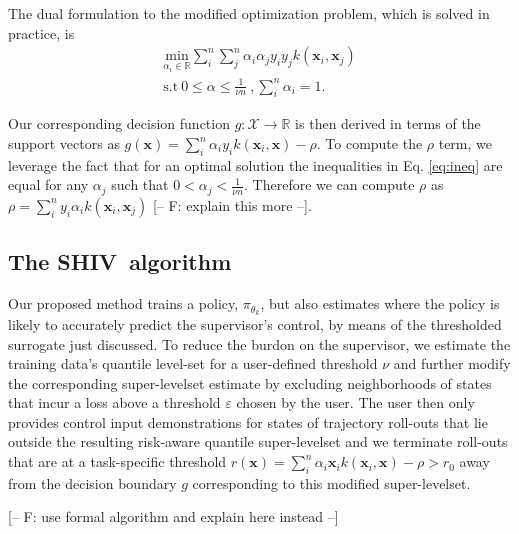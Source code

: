 \documentclass[10pt, conference]{ieeeconf}      %
\newcommand{\bx}{\mathbf{x}}
\newcommand{\acro}{SHIV}
\begin{document}
The dual formulation to the modified optimization problem, which is solved in practice, is 
\begin{align}\label{eq:dual_sup}
\underset{\alpha_i\in \mathbb{R}}{\mbox{min}} \sum_i^n \sum_j^n \alpha_i\alpha_j y_i y_jk(\bx_i,\bx_j)\\
\mbox{s.t} \: 0 \leq \alpha \leq \frac{1}{\nu n} \:, \sum_i^n \alpha_i = 1.
\end{align}

Our corresponding decision function $g:\mathcal{X}\to \mathbb{R}$ is then derived in terms of the support vectors as $g(\bx) = \sum_i^n
\alpha_i y_i k(\bx_i,\bx) - \rho$. To compute the $\rho$ term, we leverage the fact that for an optimal solution the
inequalities in Eq. \ref{eq:ineq} are equal for any $\alpha_j$ such that $0 < \alpha_j < \frac{1}{\nu n}$. Therefore we
can compute $\rho$ as  $\rho = \sum_i^n y_i \alpha_i k(\bx_i,\bx_j)$ \cite{scholkopf2001estimating} {\color{blue} [-- F:
explain this more --]}.



\subsection{The \acro~algorithm}

Our proposed method trains a policy, $\pi_{\theta_k}$, but also estimates where the policy is likely to accurately
predict the supervisor's control, by means of the thresholded surrogate just discussed.  
To reduce the burdon on the supervisor, we estimate the training data's quantile level-set for a user-defined threshold
$\nu$ and further modify the corresponding super-levelset estimate by excluding neighborhoods of states that incur a loss
above a threshold $\varepsilon$ chosen by the user.
The user then only provides control input demonstrations for states of trajectory roll-outs that lie outside the
resulting risk-aware quantile super-levelset and we terminate roll-outs that are at a task-specific threshold $r(\bx) = \sum_i^n
\alpha_i \bx_i k(\bx_i,\bx)-\rho>r_0$ away from the decision boundary $g$ corresponding to this modified super-levelset.

{\color{blue} [-- F: use formal algorithm and explain here instead --]} 
\end{document}
